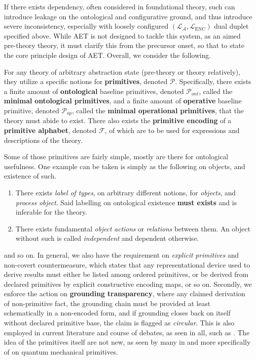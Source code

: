 If there exists dependency, often considered in foundational theory, such can introduce leakage on the ontological and configurative ground, and thus introduce severe inconsistency, especially with loosely configured $(\mathcal{L}_{\mathcal{A}},\mathcal{L}_{\mathrm{ENC}})$ dual duplet specified above. While AET is not designed to tackle this system, as an aimed pre-theory theory, it must clarify this from the precursor onset, so that to state the core principle design of AET. Overall, we consider the following. 

\begin{principle}\label{prin:principle_core_PEP}
	For any theory of arbitrary abstraction state (pre-theory or theory relatively), they utilize a specific notions for \textbf{primitives}, denoted $\mathcal{P}$. Specifically, there exists a finite amount of \textbf{ontological} baseline primitives, denoted $\mathcal{P}_{ont}$, called the \textbf{minimal ontological primitives}, and a finite amount of \textbf{operative} baseline primitive, denoted $\mathcal{P}_{op}$, called the \textbf{minimal operational primitives}, that the theory must abide to exist. There also exists the \textbf{primitive encoding} of a \textbf{primitive alphabet}, denoted $\mathcal{F}$, of which are to be used for expressions and descriptions of the theory. 
\end{principle}

Some of those primitives are fairly simple, mostly are there for ontological usefulness. One example can be taken is simply as the following on objects, and existence of such. 
\begin{enumerate}[itemsep=1pt,topsep=1pt]
	\item There exists \textit{label of types}, on arbitrary different notions, for \textit{objects}, and \textit{process object}. Said labelling on ontological existence \textbf{must exists} and is inferable for the theory. 
	\item There exists fundamental \textit{object actions} or \textit{relations} between them. An object without such is called \textit{independent} and dependent otherwise. 
\end{enumerate}
and so on. In general, we also have the requirement on \textit{explicit primitives} and non-covert countermeasure, which states that any representational device used to derive results must either be listed among ordered primitives, or be derived from declared primitives by explicit constructive encoding maps, or so on. Secondly, we enforce the action on \textbf{grounding transparency}, where any claimed derivation of non-primitive fact, the grounding chain must be provided at least schematically in a non-encoded form, and if grounding closes back on itself without declared primitive base, the claim is flagged as \textit{circular}. This is also employed in current literature and course of debates, as seen in all, such as \cite{rubio2022,schaffer2009,ladyman2007}. The idea of the primitives itself are not new, as seen by many in \cite{carnap1950,quine1948,allori2015} and more specifically of \cite{esfeld2014} on quantum mechanical primitives. 


